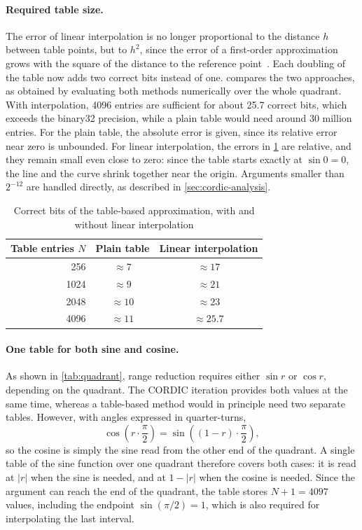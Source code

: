 \paragraph{Required table size.}
The error of linear interpolation is no longer proportional to the distance
$h$ between table points, but to $h^{2}$, since the error of a first-order
approximation grows with the square of the distance to the reference
point~\cite{muller2020}. Each doubling of the table now
adds two correct bits instead of one.  compares the two
approaches, as obtained by evaluating both methods numerically over the whole
quadrant. With interpolation, 4096 entries are sufficient for about 25.7
correct bits, which exceeds the binary32 precision, while a plain table would
need around 30 million entries. For the plain table, the absolute error is
given, since its relative error near zero is unbounded. For linear interpolation, the errors in
\cref{tab:lut-size} are relative, and they remain small even close to zero: since the table starts
exactly at $\sin 0 = 0$, the line and the curve shrink together near the
origin. Arguments smaller than $2^{-12}$ are handled directly, as described in
\cref{sec:cordic-analysis}.

\begin{table}[H]
  \centering
  \caption{Correct bits of the table-based approximation, with and without
  linear interpolation}
  \label{tab:lut-size}
  \begin{tabular}{rcc}
    \toprule
    Table entries $N$ & Plain table & Linear interpolation \\
    \midrule
    256  & $\approx 7$  & $\approx 17$   \\
    1024 & $\approx 9$  & $\approx 21$   \\
    2048 & $\approx 10$ & $\approx 23$   \\
    4096 & $\approx 11$ & $\approx 25.7$ \\
    \bottomrule
  \end{tabular}
\end{table}

\paragraph{One table for both sine and cosine.}
As shown in \cref{tab:quadrant}, range reduction requires either $\sin r$ or
$\cos r$, depending on the quadrant. The CORDIC iteration provides both values
at the same time, whereas a table-based method would in principle need two
separate tables. However, with angles expressed in quarter-turns,
\begin{equation}
  \cos\!\left(r \cdot \frac{\pi}{2}\right)
  = \sin\!\left((1 - r) \cdot \frac{\pi}{2}\right),
  \label{eq:sincosqt}
\end{equation}
so the cosine is simply the sine read from the other end of the quadrant. A
single table of the sine function over one quadrant therefore covers both
cases: it is read at $|r|$ when the sine is needed, and at $1 - |r|$ when the
cosine is needed. Since the argument can reach the end of the quadrant, the
table stores $N + 1 = 4097$ values, including the endpoint
$\sin(\pi/2) = 1$, which is also required for interpolating the last interval.

